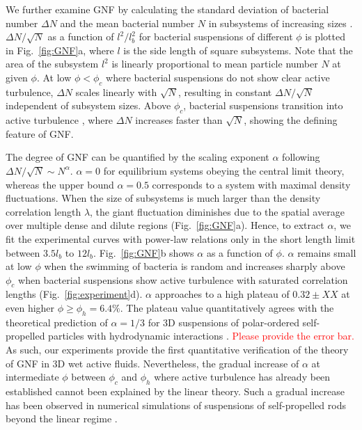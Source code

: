\documentclass[twocolumn,aps,prl,amsmath,amssymb,longbibliography]{revtex4-2}
\begin{document}
We further examine GNF by calculating the standard deviation of bacterial number $\Delta N$ and the mean bacterial number $N$ in subsystems of increasing sizes \cite{Liu2020}. $\Delta N / \sqrt N$ as a function of $l^2/l_b^2$ for bacterial suspensions of different $\phi$ is plotted in Fig.~\ref{fig:GNF}a, where $l$ is the side length of square subsystems. Note that the area of the subsystem $l^2$ is linearly proportional to mean particle number $N$ at given $\phi$. At low $\phi<\phi_c$ where bacterial suspensions do not show clear active turbulence, $\Delta N$ scales linearly with $\sqrt N$, resulting in constant $\Delta N / \sqrt N$ independent of subsystem sizes. Above $\phi_c$, bacterial suspensions transition into active turbulence \cite{Peng2020}, where $\Delta N$ increases faster than $\sqrt N$, showing the defining feature of GNF.

The degree of GNF can be quantified by the scaling exponent $\alpha$ following $\Delta N/\sqrt{N} \sim N^\alpha$. $\alpha=0$ for equilibrium systems obeying the central limit theory, whereas the upper bound $\alpha = 0.5$ corresponds to a system with maximal density fluctuations. When the size of subsystems is much larger than the density correlation length $\lambda$, the giant fluctuation diminishes due to the spatial average over multiple dense and dilute regions (Fig.~\ref{fig:GNF}a). Hence, to extract $\alpha$, we fit the experimental curves with power-law relations only in the short length limit between $3.5l_b$ to $12 l_b$. Fig.~\ref{fig:GNF}b shows $\alpha$ as a function of $\phi$. $\alpha$ remains small at low $\phi$ when the swimming of bacteria is random and increases sharply above $\phi_c$ when bacterial suspensions show active turbulence with saturated correlation lengths (Fig.~\ref{fig:experiment}d).
$\alpha$ approaches to a high plateau of $0.32 \pm XX$ at even higher $\phi \geq \phi_h = 6.4\%$. The plateau value quantitatively agrees with the theoretical prediction of $\alpha = 1/3$ for 3D suspensions of polar-ordered self-propelled particles with hydrodynamic interactions \cite{AditiSimha2002}. \textcolor{red}{Please provide the error bar.} As such, our experiments provide the first quantitative verification of the theory of GNF in 3D wet active fluids. Nevertheless, the gradual increase of $\alpha$ at intermediate $\phi$ between $\phi_c$ and $\phi_h$ where active turbulence has already been established cannot been explained by the linear theory. Such a gradual increase has been observed in numerical simulations of suspensions of self-propelled rods beyond the linear regime \cite{Saintillan2012}.
\end{document}
